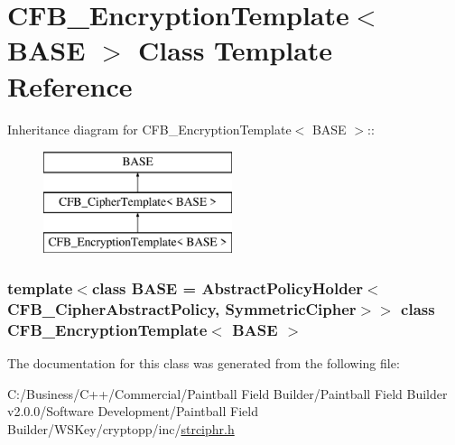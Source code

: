 \hypertarget{class_c_f_b___encryption_template}{
\section{CFB\_\-EncryptionTemplate$<$ BASE $>$ Class Template Reference}
\label{class_c_f_b___encryption_template}
}
Inheritance diagram for CFB\_\-EncryptionTemplate$<$ BASE $>$::\begin{figure}[H]
\begin{center}
\leavevmode
\includegraphics[height=3cm]{class_c_f_b___encryption_template}
\end{center}
\end{figure}
\subsubsection*{template$<$class BASE = AbstractPolicyHolder$<$CFB\_\-CipherAbstractPolicy, SymmetricCipher$>$$>$ class CFB\_\-EncryptionTemplate$<$ BASE $>$}



The documentation for this class was generated from the following file:\begin{DoxyCompactItemize}
\item 
C:/Business/C++/Commercial/Paintball Field Builder/Paintball Field Builder v2.0.0/Software Development/Paintball Field Builder/WSKey/cryptopp/inc/\hyperlink{strciphr_8h}{strciphr.h}\end{DoxyCompactItemize}
